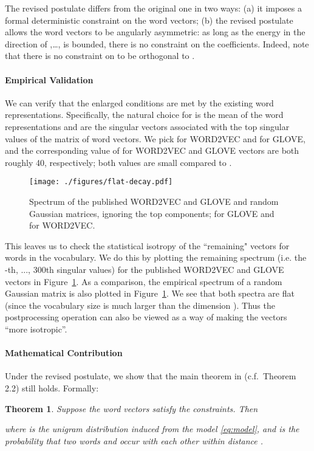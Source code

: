 \documentclass{article} \usepackage{acl2017,times}
\newtheorem{theorem}{Theorem}[section]
\begin{document}
The revised postulate differs from the original one in two ways: (a) it imposes a formal deterministic constraint on the word vectors;   (b) 
the revised postulate allows the word vectors to be angularly asymmetric: as long as the energy in the direction of ,\ldots, is bounded, there is no constraint on the coefficients. Indeed, note that  there is no constraint on   to be orthogonal to  .  


\paragraph{Empirical Validation}  We can verify  that  the enlarged  conditions are  met by  the  existing word representations.  Specifically, the natural choice for  is the mean of the word representations and  are the singular vectors associated with the top  singular values of the matrix of word vectors. We pick  for WORD2VEC and  for GLOVE, and the corresponding value of  for WORD2VEC and GLOVE vectors are both roughly  40, respectively; both values are small compared to  . 


\begin{figure}[!h]
\centering
\texttt{[image: ./figures/flat-decay.pdf]}
\caption{Spectrum of the published WORD2VEC and GLOVE and  random Gaussian matrices, ignoring the top  components;  for GLOVE and  for  WORD2VEC.}
\label{app:fig:decay}
\end{figure}

This  leaves us  to check the statistical isotropy of the 
``remaining" vectors  for words  in the vocabulary.  We do this by  plotting the  remaining spectrum (i.e. the -th, ..., 300th singular values) for the published  WORD2VEC and GLOVE  vectors in Figure~\ref{app:fig:decay}. As a comparison, the empirical spectrum of  a  random Gaussian matrix  is also  plotted in Figure~\ref{app:fig:decay}.  We see that both spectra are  flat (since the vocabulary size is much larger than the dimension ).  Thus the postprocessing operation can also be viewed as a way of making the vectors ``more isotropic''.


\paragraph{Mathematical Contribution} Under the revised postulate, we show that the main theorem in \citep{arora2015rand} (c.f.\ Theorem 2.2) still holds. Formally:  
\begin{theorem}
\label{thm:iso}
Suppose the word vectors satisfy the constraints. Then 

where  is the unigram distribution induced from the model \eqref{eq:model}, and  is the probability that two words  and  occur with each other within distance .
\end{theorem}
\end{document}
